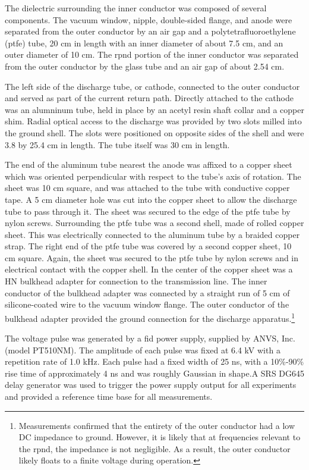 The dielectric surrounding the inner conductor was composed of several
components. The vacuum window, nipple, double-sided flange, and anode were
separated from the outer conductor by an air gap and a polytetrafluoroethylene
(\acs{ptfe}) tube, 20 cm in length with an inner diameter of about 7.5 cm, and
an outer diameter of 10 cm. The \acs{rpnd} portion of the inner conductor was
separated from the outer conductor by the glass tube and an air gap of about
2.54 cm.

The left side of the discharge tube, or cathode, connected to the outer
conductor and served as part of the current return path. Directly attached to
the cathode was an alumninum tube, held in place by an acetyl resin shaft collar
and a copper shim. Radial optical access to the discharge was provided by two
slots milled into the ground shell. The slots were positioned on opposite sides
of the shell and were 3.8 by 25.4 cm in length. The tube itself was 30 cm in
length.

The end of the aluminum tube nearest the anode was affixed to a copper sheet
which was oriented perpendicular with respect to the tube's axis of rotation.
The sheet was 10 cm square, and was attached to the tube with conductive copper
tape. A 5 cm diameter hole was cut into the copper sheet to allow the discharge
tube to pass through it. The sheet was secured to the edge of the \acs{ptfe}
tube by nylon screws. Surrounding the \acs{ptfe} tube was a second shell, made
of rolled copper sheet. This was electrically connected to the aluminum tube by
a braided copper strap. The right end of the \acs{ptfe} tube was covered by a
second copper sheet, 10 cm square. Again, the sheet was secured to the
\acs{ptfe} tube by nylon screws and in electrical contact with the copper shell.
In the center of the copper sheet was a HN bulkhead adapter for connection to
the transmission line. The inner conductor of the bulkhead adapter was connected
by a straight run of 5 cm of silicone-coated wire to the vacuum window flange.
The outer conductor of the bulkhead adapter provided the ground connection for
the discharge apparatus.\footnote{Measurements confirmed that the entirety of
the outer conductor had a low DC impedance to ground. However, it is likely that
at frequencies relevant to the \acs{rpnd}, the impedance is not negligible. As a
result, the outer conductor likely floats to a finite voltage during operation.}

The voltage pulse was generated by a \acs{fid} power supply, supplied by ANVS,
Inc. (model PT510NM). The amplitude of each pulse was fixed at 6.4 kV
with a repetition rate of 1.0 kHz. Each pulse had a fixed width of 25 ns, with a
10\%-90\% rise time of approximately 4 ns and was roughly Gaussian in shape.A
SRS DG645 delay generator was used to trigger the power supply output for all
experiments and provided a reference time base for all measurements.

